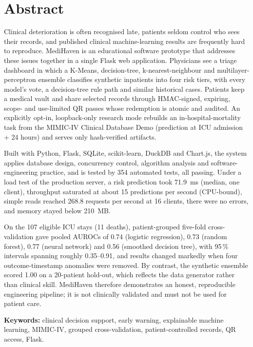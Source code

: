 \chapter*{Abstract}
Clinical deterioration is often recognised late, patients seldom control who sees their records, and
published clinical machine-learning results are frequently hard to reproduce. MediHaven is an educational
software prototype that addresses these issues together in a single Flask web application. Physicians see
a triage dashboard in which a K-Means, decision-tree, k-nearest-neighbour and multilayer-perceptron
ensemble classifies synthetic inpatients into four risk tiers, with every model's vote, a decision-tree
rule path and similar historical cases. Patients keep a medical vault and share selected records through
HMAC-signed, expiring, scope- and use-limited QR passes whose redemption is atomic and audited. An
explicitly opt-in, loopback-only research mode rebuilds an in-hospital-mortality task from the MIMIC-IV
Clinical Database Demo (prediction at ICU admission + 24 hours) and serves only hash-verified artifacts.

Built with Python, Flask, SQLite, scikit-learn, DuckDB and Chart.js, the system applies database design,
concurrency control, algorithm analysis and software-engineering practice, and is tested by 354 automated
tests, all passing. Under a load test of the production server, a risk prediction took 71.9~ms (median,
one client), throughput saturated at about 15 predictions per second (CPU-bound), simple reads reached
268.8 requests per second at 16 clients, there were no errors, and memory stayed below 210~MB.

On the 107 eligible ICU stays (11 deaths), patient-grouped five-fold cross-validation gave pooled AUROCs of
0.74 (logistic regression), 0.73 (random forest), 0.77 (neural network) and 0.56 (smoothed decision tree),
with 95\,\% intervals spanning roughly 0.35--0.91, and results changed markedly when four outcome-timestamp
anomalies were removed. By contrast, the synthetic ensemble scored 1.00 on a 20-patient hold-out, which
reflects the data generator rather than clinical skill. MediHaven therefore demonstrates an honest,
reproducible engineering pipeline; it is not clinically validated and must not be used for patient care.

\vspace{0.4cm}
\noindent\textbf{Keywords:} clinical decision support, early warning, explainable machine learning,
MIMIC-IV, grouped cross-validation, patient-controlled records, QR access, Flask.
